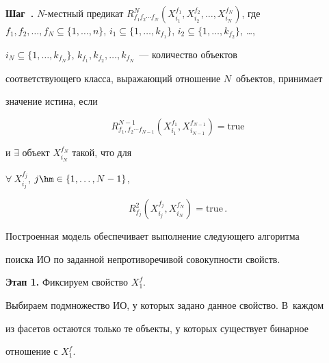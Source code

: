 \textbf{Шаг~{}.} $N$-местный предикат $R^N_{f_1 f_2\cdots  f_N}(X_{i_1}^{f_1},


X_{i_2}^{f_2}, \ldots , X_{i_N}^{f_N})$, где $f_1, f_2, \ldots , f_N \subseteq \{1, \ldots ,


n\}$, $i_1\subseteq\{1, \ldots , k_{f_1}\}$, $i_2 \subseteq \{1, \ldots  , k_{f_2}\}$, \ldots ,


$i_N\subseteq \{1, \ldots , k_{f_N}\}$, $k_{f_1}, k_{f_2}, \ldots , k_{f_N}$~--- количество объектов


соответствующего класса, выражающий отношение $N$~объектов, принимает


значение истина, если


  $$


{R}^{N-1}_{f_1,f_2 \cdots f_{N-1}}(X_{i_1}^{f_1}, X^{f_{N-1}}_{i_{N-1}}) =


\mathrm{true}


  $$


  и $\exists$  объект $X_{i_N}^{f_N}$ такой, что для


  $\forall\ X_{i_j}^{f_j}$, $j\hm\in


\{1, \ldots , N-1\}$,


  $$


{R}^2_{f_j} (X_{i_j}^{f_j}, X_{i_N}^{f_N}) =\mathrm{ true}\,.


  $$





  \smallskip





  Построенная модель обеспечивает выполнение следующего алгоритма


поиска ИО по заданной непротиворечивой совокупности свойств.





  \smallskip





\textbf{Этап 1.} Фиксируем свойство $X_1^f$.





  Выбираем подмножество ИО, у которых задано данное свойство. В~каждом


из фасетов остаются только те объекты, у которых существует бинарное


отношение с $X_1^f$.








